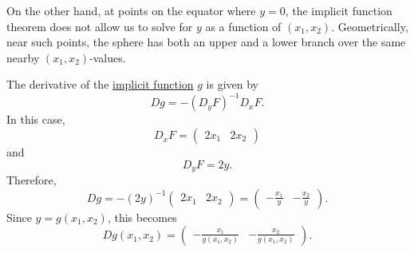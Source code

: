 \begin{example}
		On the other hand, at points on the equator where $y=0$, the implicit
		function theorem does not allow us to solve for $y$ as a function of
		$(x_1,x_2)$. Geometrically, near such points, the sphere has both an upper
		and a lower branch over the same nearby $(x_1,x_2)$-values.

		The derivative of the \hyperref[thm:implicit-function-theorem]{implicit function} $g$ is given by
		\begin{equation}
			Dg
			=
			-\left(D_yF\right)^{-1}D_xF.
		\end{equation}
		In this case,
		\begin{equation}
			D_xF
			=
			\begin{pmatrix}
				2x_1 & 2x_2
			\end{pmatrix}
		\end{equation}
		and
		\begin{equation}
			D_yF = 2y.
		\end{equation}
		Therefore,
		\begin{equation}
			Dg
			=
			-(2y)^{-1}
			\begin{pmatrix}
				2x_1 & 2x_2
			\end{pmatrix}
			=
			\begin{pmatrix}
				-\frac{x_1}{y} & -\frac{x_2}{y}
			\end{pmatrix}.
		\end{equation}
		Since $y=g(x_1,x_2)$, this becomes
		\begin{equation}
			Dg(x_1,x_2)
			=
			\begin{pmatrix}
				-\frac{x_1}{g(x_1,x_2)} &
				-\frac{x_2}{g(x_1,x_2)}
			\end{pmatrix}.
		\end{equation}
	\end{example}

